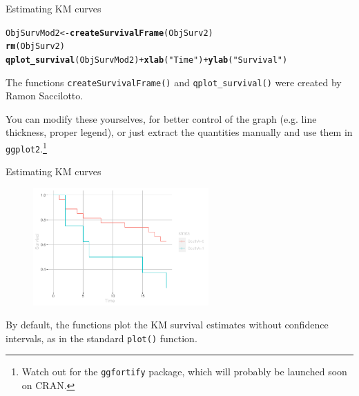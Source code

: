 \documentclass[12pt,english,pdf,xcolor=dvipsnames,aspectratio=169]{beamer}\usepackage[]{graphicx}\usepackage[]{xcolor}
\makeatletter
\newcommand{\hlstr}[1]{\textcolor[rgb]{0.192,0.494,0.8}{#1}}%
\newcommand{\hlopt}[1]{\textcolor[rgb]{0,0,0}{#1}}%
\newcommand{\hlstd}[1]{\textcolor[rgb]{0.345,0.345,0.345}{#1}}%
\newcommand{\hlkwb}[1]{\textcolor[rgb]{0.69,0.353,0.396}{#1}}%
\newcommand{\hlkwd}[1]{\textcolor[rgb]{0.737,0.353,0.396}{\textbf{#1}}}%
\newenvironment{kframe}{%
 \def\at@end@of@kframe{}%
 \ifinner\ifhmode%
  \def\at@end@of@kframe{\end{minipage}}%
  \begin{minipage}{\columnwidth}%
 \fi\fi%
 \def\FrameCommand##1{\hskip\@totalleftmargin \hskip-\fboxsep
 \colorbox{shadecolor}{##1}\hskip-\fboxsep
     \hskip-\linewidth \hskip-\@totalleftmargin \hskip\columnwidth}%
 \MakeFramed {\advance\hsize-\width
   \@totalleftmargin\z@ \linewidth\hsize
   \@setminipage}}%
 {\par\unskip\endMakeFramed%
 \at@end@of@kframe}
\newenvironment{knitrout}{}{} %
\makeatother
\begin{document}
\begin{frame}[fragile]{Estimating KM curves}




\begin{knitrout}\scriptsize
{}\color{fgcolor}\begin{kframe}
\begin{alltt}
\hlstd{ObjSurvMod2} \hlkwb{<-} \hlkwd{createSurvivalFrame}\hlstd{(ObjSurv2)}
\hlkwd{rm}\hlstd{(ObjSurv2)}
\hlkwd{qplot_survival}\hlstd{(ObjSurvMod2)} \hlopt{+} \hlkwd{xlab}\hlstd{(}\hlstr{"Time"}\hlstd{)} \hlopt{+} \hlkwd{ylab}\hlstd{(}\hlstr{"Survival"}\hlstd{)}
\end{alltt}
\end{kframe}
\end{knitrout}



The functions \texttt{createSurvivalFrame()} and \texttt{qplot\_survival()} were created by Ramon Saccilotto.\bigskip

You can modify these yourselves, for better control of the graph (e.g. line thickness, proper legend), or just extract the quantities manually and use them in \texttt{ggplot2}.\footnote{Watch out for the \texttt{ggfortify} package, which will probably be launched soon on CRAN.}
\end{frame}




\begin{frame}[fragile]{Estimating KM curves}

\begin{figure}[ht]
  \centering
  \includegraphics[width=0.6\textwidth]{../03-graphs/01-04.pdf}
\end{figure}

By default, the functions plot the KM survival estimates without confidence intervals, as in the standard \texttt{plot()} function.
\end{frame}
\end{document}
